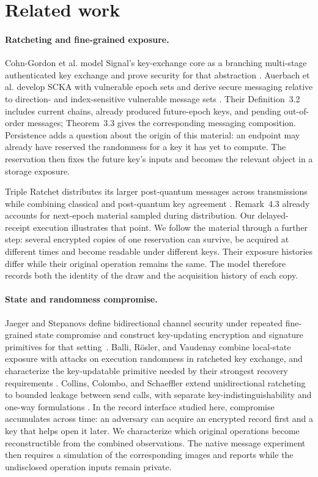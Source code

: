 \section{Related work}
\label{sec:related-work}

\paragraph{Ratcheting and fine-grained exposure.}
Cohn-Gordon et al. model Signal's key-exchange core as a branching multi-stage
authenticated key exchange and prove security for that abstraction
\cite{signal2020}. Auerbach et al. develop SCKA with vulnerable epoch sets and
derive secure messaging relative to direction- and index-sensitive vulnerable
message sets \cite{scka2025}. Their Definition~3.2 includes current chains,
already produced future-epoch keys, and pending out-of-order messages;
Theorem~3.3 gives the corresponding messaging composition. Persistence
adds a question about the origin of this material: an endpoint may
already have reserved the randomness for a key it has yet to compute.
The reservation then fixes the future key's inputs and becomes the
relevant object in a storage exposure.

Triple Ratchet distributes its larger post-quantum messages across
transmissions while combining classical and post-quantum key agreement
\cite{tripleratchet2025}. Remark~4.3 already accounts for next-epoch
material sampled during distribution. Our delayed-receipt execution
illustrates that point. We follow the material through a further
step: several encrypted copies of one reservation can survive, be
acquired at different times and become readable under different keys.
Their exposure histories differ while their original operation remains
the same. The model therefore records both the identity of the draw and
the acquisition history of each copy.

\paragraph{State and randomness compromise.}
Jaeger and Stepanovs define bidirectional channel security under repeated
fine-grained state compromise and construct key-updating encryption and
signature primitives for that setting~\cite{jaeger2018channel}.
Balli, R\"osler, and Vaudenay combine local-state exposure with attacks on
execution randomness in ratcheted key exchange, and characterize the
key-updatable primitive needed by their strongest recovery requirements
\cite{balli2020ratcheting}. Collins, Colombo, and Schaeffler extend
unidirectional ratcheting to bounded leakage between send calls, with
separate key-indistinguishability and one-way formulations
\cite{collins2025leakage}.
In the record interface studied here, compromise accumulates across
time: an adversary can acquire an encrypted record first and a key
that helps open it later. We characterize which original operations
become reconstructible from the combined observations. The native
message experiment then requires a simulation of the corresponding
images and reports while the undisclosed operation inputs remain private.


